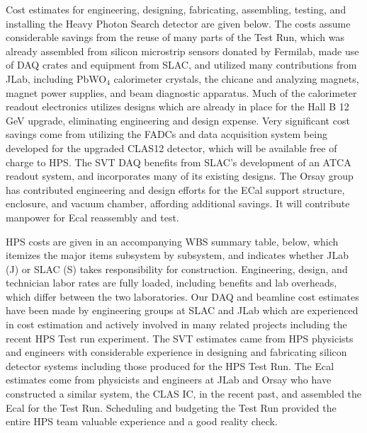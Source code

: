 \label{sec:schcost}

Cost estimates for engineering, designing, fabricating, assembling, testing, and installing the Heavy Photon Search detector 
are given below. The costs assume considerable savings from the reuse of many parts of the Test Run, which was already assembled 
from silicon microstrip sensors donated by Fermilab, made use of DAQ crates and equipment from SLAC,
and utilized many contributions from JLab, including PbWO$_4$ calorimeter crystals, the chicane and analyzing magnets, magnet power supplies,
and beam diagnostic apparatus. Much of the calorimeter readout electronics utilizes designs which are already in place for the Hall
B 12 GeV upgrade, eliminating engineering and design expense. Very significant cost savings come from utilizing the FADCs and data acquisition 
system being developed for the upgraded CLAS12 detector, which will be available free of charge to HPS. The SVT DAQ benefits from SLAC's 
development of an ATCA readout system, and incorporates many of its existing designs.  The Orsay group has
contributed engineering and design efforts for the ECal support structure, enclosure, and vacuum chamber, affording additional savings. It will
contribute manpower for Ecal reassembly and test.  

HPS costs are given in an accompanying WBS summary table, below, which itemizes the major items subsystem by subsystem, and 
indicates whether JLab (J) or SLAC (S) takes responsibility for construction. Engineering, design, and technician labor rates are fully loaded, 
including benefits and lab overheads, which differ between the two laboratories. Our 
DAQ and beamline cost estimates have been made by engineering groups at SLAC and JLab which are experienced in cost estimation and 
actively involved in many related projects including the recent HPS Test run experiment. The SVT estimates came from HPS physicists and engineers  with
considerable experience in designing and fabricating silicon detector systems including those produced for the HPS Test Run. 
The Ecal estimates come from physicists and engineers at 
JLab and Orsay who have constructed a similar system, the CLAS IC, in the recent past, and assembled the Ecal for the Test Run.
Scheduling and budgeting the Test Run provided the entire HPS team valuable experience and a good reality check. 

